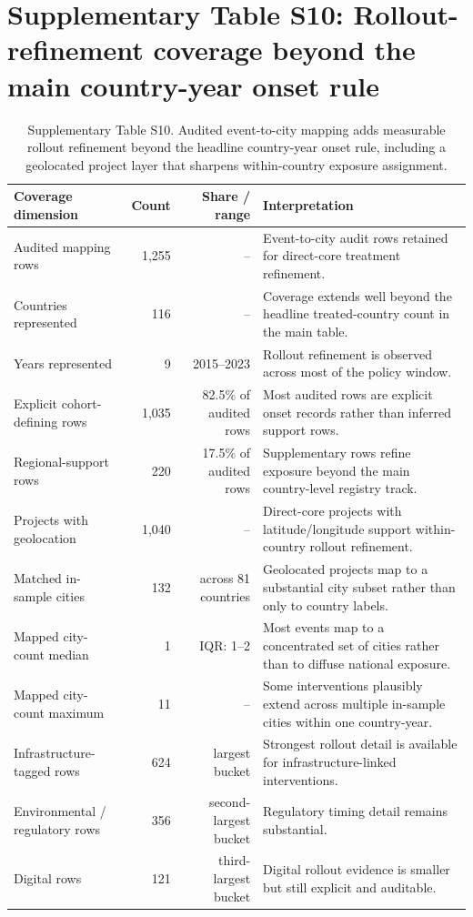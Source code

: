 \documentclass[oneside,pdflatex,sn-nature]{sn-jnl}
\begin{document}
\section{Supplementary Table S10: Rollout-refinement coverage beyond the main country-year onset rule}

\begin{table}[H]
\centering
\caption{Supplementary Table S10. Audited event-to-city mapping adds measurable rollout refinement beyond the headline country-year onset rule, including a geolocated project layer that sharpens within-country exposure assignment.}
\small
\setlength{\tabcolsep}{4pt}
\begin{tabular}{p{}rrp{}}
\toprule
Coverage dimension & Count & Share / range & Interpretation \\
\midrule
Audited mapping rows & 1,255 & -- & Event-to-city audit rows retained for direct-core treatment refinement. \\
Countries represented & 116 & -- & Coverage extends well beyond the headline treated-country count in the main table. \\
Years represented & 9 & 2015--2023 & Rollout refinement is observed across most of the policy window. \\
Explicit cohort-defining rows & 1,035 & 82.5\% of audited rows & Most audited rows are explicit onset records rather than inferred support rows. \\
Regional-support rows & 220 & 17.5\% of audited rows & Supplementary rows refine exposure beyond the main country-level registry track. \\
Projects with geolocation & 1,040 & -- & Direct-core projects with latitude/longitude support within-country rollout refinement. \\
Matched in-sample cities & 132 & across 81 countries & Geolocated projects map to a substantial city subset rather than only to country labels. \\
Mapped city-count median & 1 & IQR: 1--2 & Most events map to a concentrated set of cities rather than to diffuse national exposure. \\
Mapped city-count maximum & 11 & -- & Some interventions plausibly extend across multiple in-sample cities within one country-year. \\
Infrastructure-tagged rows & 624 & largest bucket & Strongest rollout detail is available for infrastructure-linked interventions. \\
Environmental / regulatory rows & 356 & second-largest bucket & Regulatory timing detail remains substantial. \\
Digital rows & 121 & third-largest bucket & Digital rollout evidence is smaller but still explicit and auditable. \\
\bottomrule
\end{tabular}
\end{table}
\FloatBarrier
\end{document}
